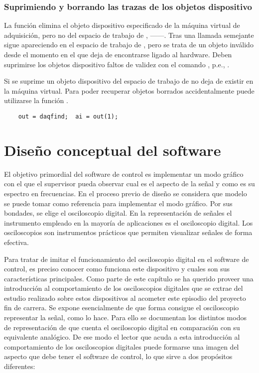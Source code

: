 \subsubsection{Suprimiendo y borrando las trazas de los objetos dispositivo}

La función  elimina el objeto dispositivo especificado de la
máquina virtual de adquisición, pero no del espacio de trabajo de
\matlab{}, ------. Tras una llamada semejante
 sigue apareciendo en el espacio de trabajo de \matlab{}, pero
se trata de un objeto inválido desde el momento en el que deja de
encontrarse ligado al hardware. Deben suprimirse los objetos dispositivo
faltos de validez con el comando , p.e., .

Si se suprime un objeto dispositivo del espacio de trabajo de \matlab{} no
deja de existir en la máquina virtual. Para poder recuperar objetos
borrados accidentalmente puede utilizarse la función .

\begin{lstlisting}
	out = daqfind;	ai = out(1);
\end{lstlisting}


\section{Diseño conceptual del software}

El objetivo primordial del software de control es implementar un modo
gráfico con el que el supervisor pueda observar cual es el aspecto de la
señal y como es su espectro en frecuencias. En el proceso previo de diseño
se considera que modelo se puede tomar como referencia para implementar el
modo gráfico. Por sus bondades, se elige el osciloscopio digital. En la
representación de señales el instrumento empleado en la mayoría de
aplicaciones es el osciloscopio digital. Los osciloscopios son instrumentos
prácticos que permiten visualizar señales de forma efectiva.

Para tratar de imitar el funcionamiento del osciloscopio digital en el
software de control, es preciso conocer como funciona este dispositivo y
cuales son sus características principales. Como parte de este capítulo se
ha querido proveer una introducción al comportamiento de los osciloscopios
digitales que se extrae del estudio realizado sobre estos dispositivos al
acometer este episodio del proyecto fin de carrera. Se expone esencialmente
de que forma consigue el osciloscopio representar la señal, como lo hace.
Para ello se documentan los distintos modos de representación de que cuenta
el osciloscopio digital en comparación con su equivalente analógico. De ese
modo el lector que acuda a esta introducción al comportamiento de los
osciloscopios digitales puede formarse una imagen del aspecto que debe
tener el software de control, lo que sirve a dos propósitos diferentes:

